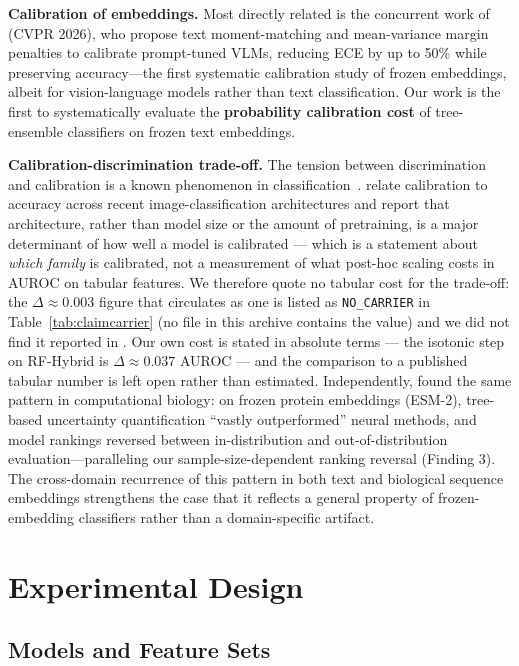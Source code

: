 \documentclass[11pt]{article}
\begin{document}
\textbf{Calibration of embeddings.} Most directly related is the concurrent work of \citet{sharifdeen2026calibrating} (CVPR 2026), who propose text moment-matching and mean-variance margin penalties to calibrate prompt-tuned VLMs, reducing ECE by up to 50\% while preserving accuracy---the first systematic calibration study of frozen embeddings, albeit for vision-language models rather than text classification. Our work is the first to systematically evaluate the \textbf{probability calibration cost} of tree-ensemble classifiers on frozen text embeddings.

\textbf{Calibration-discrimination trade-off.} The tension between discrimination and calibration is a known phenomenon in classification~\cite{cohen2005semiparametric}. \citet{wang2021revisiting} relate calibration to accuracy across recent image-classification architectures and report that architecture, rather than model size or the amount of pretraining, is a major determinant of how well a model is calibrated --- which is a statement about \emph{which family} is calibrated, not a measurement of what post-hoc scaling costs in AUROC on tabular features. We therefore quote no tabular cost for the trade-off: the $\Delta{\approx}0.003$ figure that circulates as one is listed as \texttt{NO\_CARRIER} in Table~\ref{tab:claimcarrier} (no file in this archive contains the value) and we did not find it reported in \citet{wang2021revisiting}. Our own cost is stated in absolute terms --- the isotonic step on RF-Hybrid is $\Delta{\approx}0.037$ AUROC --- and the comparison to a published tabular number is left open rather than estimated. Independently, \citet{abbott2026benchmarking} found the same pattern in computational biology: on frozen protein embeddings (ESM-2), tree-based uncertainty quantification ``vastly outperformed'' neural methods, and model rankings reversed between in-distribution and out-of-distribution evaluation---paralleling our sample-size-dependent ranking reversal (Finding 3). The cross-domain recurrence of this pattern in both text and biological sequence embeddings strengthens the case that it reflects a general property of frozen-embedding classifiers rather than a domain-specific artifact.

\section{Experimental Design}
\label{sec:setup}

\subsection{Models and Feature Sets}
\end{document}
